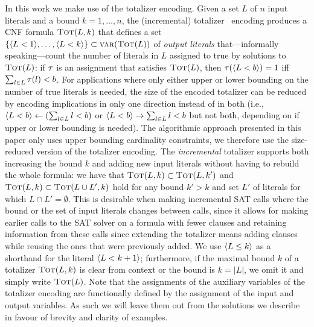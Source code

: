 In this work we make use of the totalizer encoding.
Given a set $L$ of $n$ input literals and a bound $k=1, \ldots, n$, the (incremental) totalizer~\autocites{DBLP:conf/cp/BailleuxB03,DBLP:conf/cp/MartinsJML14} encoding produces a CNF formula $\textsc{Tot}(L, k)$ that defines a set $\{\langle L < 1 \rangle, \ldots, \langle L < k \rangle\} \subset \textsc{var}(\textsc{Tot}(L))$ of \emph{output literals} that---informally speaking---count the number of literals in $L$ assigned to true by solutions to $\textsc{Tot}(L)$:
if $\tau$ is an assignment that satisfies $\textsc{Tot}(L)$, then $\tau(\langle L < b \rangle) = 1$ iff $\sum_{l \in L} \tau(l) < b$.
For applications where only either upper or lower bounding on the number of true literals is needed, the size of the encoded totalizer can be reduced by encoding implications in only one direction instead of in both (i.e., $\langle L < b \rangle \leftarrow (\sum_{l \in L} l < b)$ or $\langle L < b \rangle \rightarrow \sum_{l \in L} l < b$ but not both, depending on if upper or lower bounding is needed).
The algorithmic approach presented in this paper only uses upper bounding cardinality constraints, we therefore use the size-reduced version of the totalizer encoding.
The \emph{incremental} totalizer supports both increasing the bound $k$ and adding new input literals without having to rebuild the whole formula:
we have that $\textsc{Tot}(L, k) \subset \textsc{Tot}(L, k')$ and $\textsc{Tot}(L, k) \subset  \textsc{Tot}(L \cup L', k)$ hold for any bound $k' > k$ and set $L'$ of literals for which $L \cap L' =  \emptyset$. 
This is desirable when making incremental SAT calls where the bound or the set of input literals changes between calls, since it allows for making earlier calls to the SAT solver on a formula with fewer clauses and retaining information from these calls since extending the totalizer means adding clauses while reusing the ones that were previously added.
We use $\langle L \leq k \rangle$ as a shorthand for the literal $\langle L < k+1 \rangle$;
furthermore, if the maximal bound $k$ of a totalizer $\textsc{Tot}(L,k)$ is clear from context or the bound is $k=|L|$, we omit it and simply write $\textsc{Tot}(L)$.
Note that the assignments of the auxiliary variables of the totalizer encoding are functionally defined by the assignment of the input and output variables.
As such we will leave them out from the solutions we describe in favour of brevity and clarity of examples. 